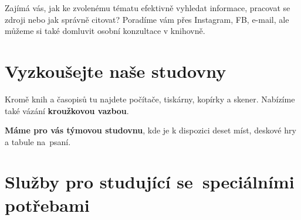 Zajímá vás, jak ke zvolenému tématu efektivně vyhledat informace, pracovat se
zdroji nebo jak správně citovat? Poradíme vám přes Instagram, FB, e-mail, ale
můžeme si také domluvit osobní konzultace v knihovně.



\ikonka{\faGraduationCap}
\section{Vyzkoušejte naše studovny}

Kromě knih a časopisů tu najdete počítače, tiskárny, kopírky a
skener. Nabízíme také vázání \textbf{kroužkovou vazbou}. 




\textbf{Máme pro vás týmovou studovnu},  kde je k dispozici deset míst, deskové hry
a tabule na~psaní.





\bigskip
\ikonka{\faHeart}
\section{Služby pro studující se~speciálními potřebami}

